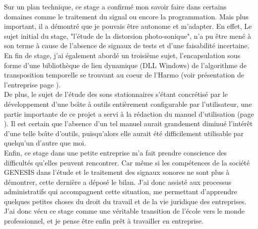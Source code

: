 Sur un plan technique, ce stage a confirm{\'e} mon savoir faire dans
certains domaines comme le traitement du signal ou encore la
programmation. Mais plus important, il a d{\'e}montr{\'e} que je pouvais
{\^e}tre autonome et m'adapter. En effet, Le sujet initial du stage,
"l'{\'e}tude de la distorsion photo-sonique", n'a pu {\^e}tre men{\'e} {\`a} son
terme {\`a} cause de l'absence de signaux de tests et d'une
faisabilit{\'e} incertaine. En fin de stage, j'ai {\'e}galement abord{\'e} un
troisi{\`e}me sujet, l'encapsulation sous forme d'une biblioth{\`e}que de
lien dynamique (DLL Windows) de l'algorithme de transposition
temporelle se trouvant au coeur de l'Harmo (voir pr{\'e}sentation de
l'entreprise page \pageref{genesis}).\\

De plus, le sujet de l'{\'e}tude des sons stationnaires s'{\'e}tant
concr{\'e}tis{\'e} par le d{\'e}veloppement d'une bo{\^\i}te {\`a} outils enti{\`e}rement
configurable par l'utilisateur, une partie importante de ce projet
a servi {\`a} la r{\'e}daction du manuel d'utilisation (page
\pageref{manuel}). Il est certain que l'absence d'un tel manuel
aurait grandement diminu{\'e} l'int{\'e}r{\^e}t d'une telle bo{\^\i}te d'outils,
puisqu'alors elle aurait {\'e}t{\'e} difficilement utilisable par
quelqu'un d'autre que moi.\\

Enfin, ce stage dans une petite entreprise m'a fait prendre
conscience des difficult{\'e}s qu'elles peuvent rencontrer. Car m{\^e}me
si les comp{\'e}tences de la soci{\'e}t{\'e} GENESIS dans l'{\'e}tude et le
traitement des signaux sonores ne sont plus {\`a} d{\'e}montrer, cette
derni{\`e}re a d{\'e}pos{\'e} le bilan. J'ai donc assist{\'e} aux processus
administratifs qui accompagnent cette situation, me permettant
d'apprendre quelques petites choses du droit du travail et de la
vie juridique des entreprises.\\

J'ai donc v{\'e}cu ce stage comme une v{\'e}ritable transition de l'{\'e}cole
vers le monde professionnel, et je pense {\^e}tre enfin pr{\^e}t {\`a}
travailler en entreprise.\\
